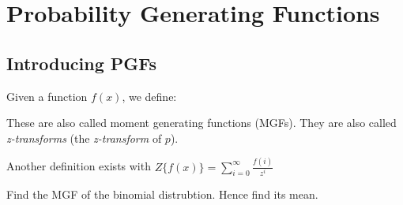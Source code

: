 
\chapter{Probability Generating Functions}



\section{Introducing PGFs}

Given a function $f(x)$, we define:

These are also called moment generating functions (MGFs). 
They are also called \textit{z-transforms} (the \textit{z-transform} of $p$). 

Another definition exists with $Z\{f(x)\} = \sum^{\infty}_{i=0} \frac{f(i)}{z^{i}}$



\begin{example}
Find the MGF of the binomial distrubtion. Hence find its mean.
\end{example}